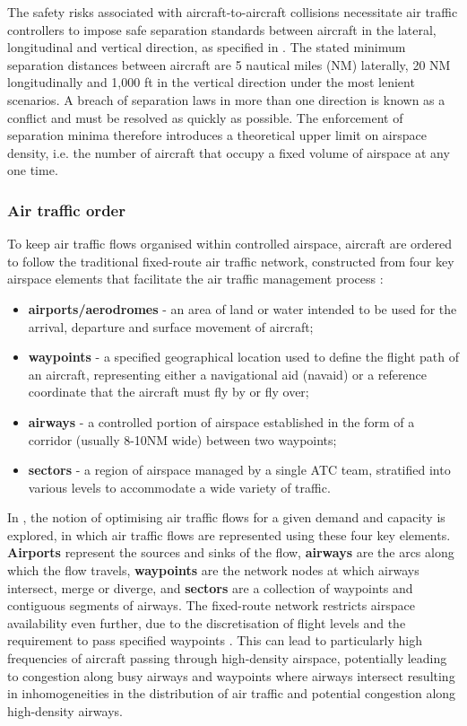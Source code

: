 The safety risks associated with aircraft-to-aircraft collisions necessitate air traffic controllers to impose safe separation standards between aircraft in the lateral, longitudinal and vertical direction, as specified in \cite{ICAOPANSDoc44442016}. The stated minimum separation distances between aircraft are 5 nautical miles (NM) laterally, 20 NM longitudinally and 1,000 ft in the vertical direction under the most lenient scenarios. A breach of separation laws in more than one direction is known as a conflict and must be resolved as quickly as possible. The enforcement of separation minima therefore introduces a theoretical upper limit on airspace density, i.e. the number of aircraft that occupy a fixed volume of airspace at any one time. 

\subsubsection{Air traffic order} 
To keep air traffic flows organised within controlled airspace, aircraft are ordered to follow the traditional fixed-route air traffic network, constructed from four key airspace elements that facilitate the air traffic management process \cite{SecretariatGeneral2016}:

\begin{itemize}
\item \textbf{airports/aerodromes} - an area of land or water intended to be used for the arrival, departure and surface movement of aircraft;
\item \textbf{waypoints} - a specified geographical location used to define the flight path of an aircraft, representing either a navigational aid (navaid) or a reference coordinate that the aircraft must fly by or fly over;
\item \textbf{airways} - a controlled portion of airspace established in the form of a corridor (usually 8-10NM wide) between two waypoints;
\item \textbf{sectors} - a region of airspace managed by a single ATC team, stratified into various levels to accommodate a wide variety of traffic.
\end{itemize}

In \cite{Odoni1987}, the notion of optimising air traffic flows for a given demand and capacity is explored, in which air traffic flows are represented using these four key elements. \textbf{Airports} represent the sources and sinks of the flow, \textbf{airways} are the arcs along which the flow travels, \textbf{waypoints} are the network nodes at which airways intersect, merge or diverge, and \textbf{sectors} are a collection of waypoints and contiguous segments of airways. The fixed-route network restricts airspace availability even further, due to the discretisation of flight levels and the requirement to pass specified waypoints \cite{Bilimoria1996, FAA2017}. This can lead to particularly high frequencies of aircraft passing through high-density airspace, potentially leading to congestion along busy airways and waypoints where airways intersect resulting in inhomogeneities in the distribution of air traffic and potential congestion along high-density airways.

